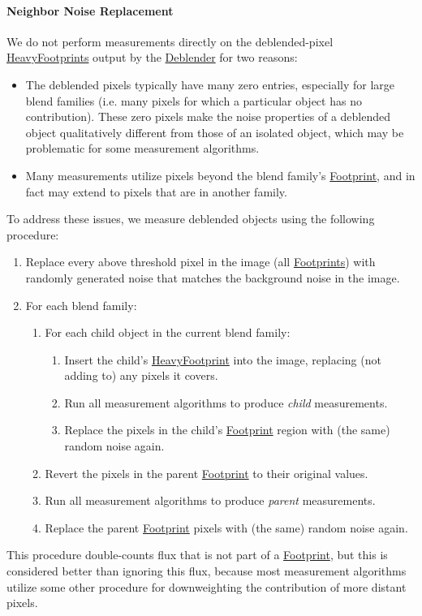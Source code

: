 \paragraph{Neighbor Noise Replacement}
\label{sec:acReplaceNeighborsWithNoise}

We do not perform measurements directly on the deblended-pixel \hyperref[sec:spFootprintsHeavy]{HeavyFootprints} output by the \hyperref[sec:acDeblending]{Deblender} for two reasons:
\begin{itemize}
\item The deblended pixels typically have many zero entries, especially for large blend families (i.e. many pixels for which a particular object has no contribution).  These zero pixels make the noise properties of a deblended object qualitatively different from those of an isolated object, which may be problematic for some measurement algorithms.
\item Many measurements utilize pixels beyond the blend family's \hyperref[sec:spFootprintsHeavy]{Footprint}, and in fact may extend to pixels that are in another family.
\end{itemize}
To address these issues, we measure deblended objects using the following
procedure:
\begin{enumerate}
\item Replace every above threshold pixel in the image (all \hyperref[sec:spFootprints]{Footprints}) with randomly generated noise that matches the background noise in the image.
\item For each blend family:
    \begin{enumerate}
    \item For each child object in the current blend family:
        \begin{enumerate}
        \item Insert the child's \hyperref[sec:spFootprintsHeavy]{HeavyFootprint} into the image, replacing (not adding to) any pixels it covers.
        \item Run all measurement algorithms to produce \emph{child} measurements.
        \item Replace the pixels in the child's \hyperref[sec:spFootprints]{Footprint} region with (the same) random noise again.
        \end{enumerate}
    \item Revert the pixels in the parent \hyperref[sec:spFootprints]{Footprint} to their original values.
    \item Run all measurement algorithms to produce \emph{parent} measurements.
    \item Replace the parent \hyperref[sec:spFootprints]{Footprint} pixels with (the same) random noise again.
    \end{enumerate}
\end{enumerate}
This procedure double-counts flux that is not part of a \hyperref[sec:spFootprints]{Footprint}, but this is considered better than ignoring this flux, because most measurement algorithms utilize some other procedure for downweighting the contribution of more distant pixels.

